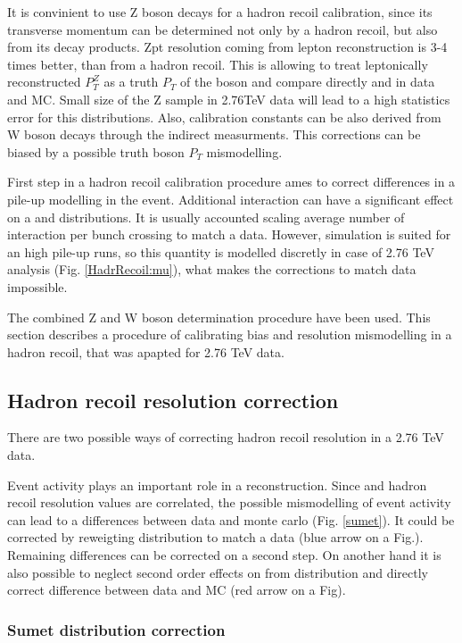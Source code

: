 It is convinient to use Z boson decays for a hadron recoil calibration, since its transverse momentum can be determined not only by a hadron recoil, but also from its decay products.  Zpt resolution coming from lepton reconstruction is 3-4 times better, than from a hadron recoil. This is allowing to treat leptonically reconstructed $P_T^{Z}$ as a truth $P_T$ of the boson and compare directly \uperp and \upar in data and MC. Small size of the Z sample in 2.76TeV data will lead to a high statistics error for this distributions. Also, calibration constants can be also derived from W boson decays through the indirect measurments. This corrections can be biased by a possible truth boson $P_T$ mismodelling. 
 
 First step in a hadron recoil calibration procedure ames to correct differences in a pile-up modelling in the event. Additional interaction can have a significant effect on a \etmiss and \sumet distributions.   It is usually accounted scaling average number of interaction per bunch crossing to match a data. However, \atlas simulation is suited for an high pile-up runs, so this quantity is modelled discretly in case of 2.76 TeV analysis (Fig. \ref{HadrRecoil:mu}), what makes the corrections to match data impossible. 

The combined Z and W boson determination procedure have been used. This section describes a procedure of calibrating bias and resolution mismodelling in a hadron recoil, that was apapted for 2.76 TeV data. 

\subsection{Hadron recoil resolution correction}
There are two possible ways of correcting hadron recoil resolution in a 2.76 TeV data. 

Event activity plays an important role in a \etmiss reconstruction. Since \sumet and hadron recoil resolution values are correlated, the possible mismodelling of event activity can lead to a differences between data and monte carlo (Fig. \ref{sumet}). It could be corrected by reweigting \sumet distribution to match a data (blue arrow on a Fig.). Remaining differences can be corrected on a second step. On another hand it is also possible to neglect second order effects on \etmiss from \sumet distribution and directly correct difference between data and MC (red arrow on a Fig).

\subsubsection{Sumet distribution correction}

